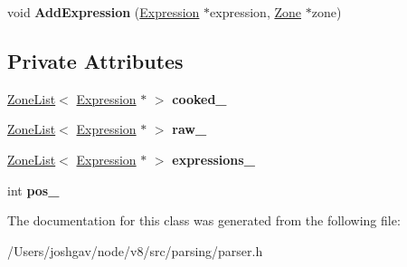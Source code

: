 \begin{DoxyCompactItemize}
\item 
void {\bfseries Add\+Expression} (\hyperlink{classv8_1_1internal_1_1_expression}{Expression} $\ast$expression, \hyperlink{classv8_1_1internal_1_1_zone}{Zone} $\ast$zone)\hypertarget{classv8_1_1internal_1_1_parser_traits_1_1_template_literal_a8aaed4f251d4659dd974c1e497b1c9b3}{}\label{classv8_1_1internal_1_1_parser_traits_1_1_template_literal_a8aaed4f251d4659dd974c1e497b1c9b3}

\end{DoxyCompactItemize}
\subsection*{Private Attributes}
\begin{DoxyCompactItemize}
\item 
\hyperlink{classv8_1_1internal_1_1_zone_list}{Zone\+List}$<$ \hyperlink{classv8_1_1internal_1_1_expression}{Expression} $\ast$ $>$ {\bfseries cooked\+\_\+}\hypertarget{classv8_1_1internal_1_1_parser_traits_1_1_template_literal_a0acb15e7a4a1f3018f60bcb5b1bf6527}{}\label{classv8_1_1internal_1_1_parser_traits_1_1_template_literal_a0acb15e7a4a1f3018f60bcb5b1bf6527}

\item 
\hyperlink{classv8_1_1internal_1_1_zone_list}{Zone\+List}$<$ \hyperlink{classv8_1_1internal_1_1_expression}{Expression} $\ast$ $>$ {\bfseries raw\+\_\+}\hypertarget{classv8_1_1internal_1_1_parser_traits_1_1_template_literal_a514e01b916af46fc2ba7682cc93c1e04}{}\label{classv8_1_1internal_1_1_parser_traits_1_1_template_literal_a514e01b916af46fc2ba7682cc93c1e04}

\item 
\hyperlink{classv8_1_1internal_1_1_zone_list}{Zone\+List}$<$ \hyperlink{classv8_1_1internal_1_1_expression}{Expression} $\ast$ $>$ {\bfseries expressions\+\_\+}\hypertarget{classv8_1_1internal_1_1_parser_traits_1_1_template_literal_a77e6a1bc30e83a117f073e232c1079a5}{}\label{classv8_1_1internal_1_1_parser_traits_1_1_template_literal_a77e6a1bc30e83a117f073e232c1079a5}

\item 
int {\bfseries pos\+\_\+}\hypertarget{classv8_1_1internal_1_1_parser_traits_1_1_template_literal_ab59af6897fc195f0017cb457959e169b}{}\label{classv8_1_1internal_1_1_parser_traits_1_1_template_literal_ab59af6897fc195f0017cb457959e169b}

\end{DoxyCompactItemize}


The documentation for this class was generated from the following file\+:\begin{DoxyCompactItemize}
\item 
/\+Users/joshgav/node/v8/src/parsing/parser.\+h\end{DoxyCompactItemize}
